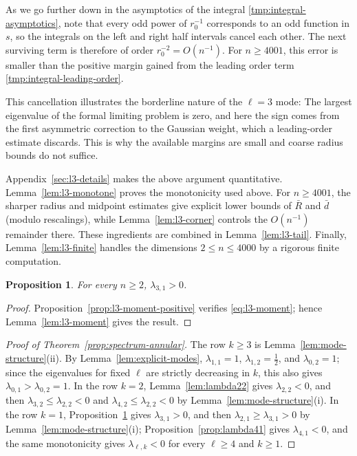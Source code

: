 \documentclass[11pt]{article}
\numberwithin{equation}{section}
\newtheorem{proposition}[theorem]{Proposition}
\theoremstyle{definition}
\begin{document}
As we go further down in the asymptotics of the integral \eqref{tmp:integral-asymptotics}, note that every odd power of $r_0^{-1}$ corresponds to an odd function in $s$, so the integrals on the left and right half intervals cancel each other. The next surviving term is therefore of order $r_0^{-2} = O(n^{-1})$.
For $n\geq4001$, this error is smaller than
the positive margin gained from the leading order term \eqref{tmp:integral-leading-order}.

This cancellation illustrates the borderline nature of
the $\ell=3$ mode: The largest eigenvalue of the formal limiting problem is
zero, and here the sign comes from the first asymmetric correction to the
Gaussian weight, which a leading-order estimate discards. This is why the
available margins are small and coarse radius bounds do not suffice.


Appendix~\ref{sec:l3-details} makes the above argument quantitative.
Lemma~\ref{lem:l3-monotone} proves the monotonicity used above. For
$n\geq4001$, the sharper radius and midpoint estimates give explicit lower bounds of $\bar{R}$ and $\bar{d}$ (modulo rescalings), %
while Lemma~\ref{lem:l3-corner} controls the
$O(n^{-1})$ remainder there. These ingredients are combined in
Lemma~\ref{lem:l3-tail}. Finally, Lemma~\ref{lem:l3-finite} handles the
dimensions $2\leq n\leq4000$ by a rigorous finite computation.

\begin{proposition}\label{prop:lambda31}
For every $n\geq2$, $\lambda_{3,1}>0$.
\end{proposition}

\begin{proof}
Proposition~\ref{prop:l3-moment-positive} verifies
\eqref{eq:l3-moment}; hence Lemma~\ref{lem:l3-moment} gives the result.
\end{proof}


\begin{proof}[{Proof of Theorem~\ref{prop:spectrum-annular}}]
The row $k\geq3$ is Lemma~\ref{lem:mode-structure}(ii). By Lemma~\ref{lem:explicit-modes}, $\lambda_{1,1}=1$, $\lambda_{1,2}=\frac12$, and $\lambda_{0,2}=1$; since the eigenvalues for fixed $\ell$ are strictly decreasing in $k$, this also gives $\lambda_{0,1}>\lambda_{0,2}=1$. In the row $k=2$, Lemma~\ref{lem:lambda22} gives $\lambda_{2,2}<0$, and then $\lambda_{3,2}\leq\lambda_{2,2}<0$ and $\lambda_{4,2}\leq\lambda_{2,2}<0$ by Lemma~\ref{lem:mode-structure}(i). In the row $k=1$, Proposition~\ref{prop:lambda31} gives $\lambda_{3,1}>0$, and then $\lambda_{2,1}\geq\lambda_{3,1}>0$ by Lemma~\ref{lem:mode-structure}(i); Proposition~\ref{prop:lambda41} gives $\lambda_{4,1}<0$, and the same monotonicity gives $\lambda_{\ell,k}<0$ for every $\ell\geq4$ and $k\geq1$.
\end{proof}
\end{document}
